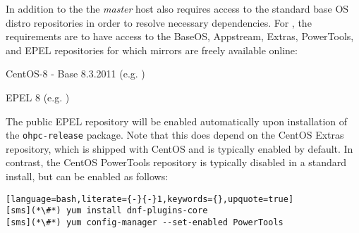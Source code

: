 In addition to the \OHPC{} 
\iftoggle{isxCAT}{and \xCAT{} package repositories,}{package repository,}
the {\em master} host also requires access to the standard base OS distro
repositories in order to resolve necessary dependencies. For \baseOS{}, the
requirements are to have access to the BaseOS, Appstream, Extras, PowerTools,
and EPEL repositories for which mirrors are freely available online:

\begin{itemize*}
\item CentOS-8 - Base 8.3.2011
  (e.g. \href{http://mirror.centos.org/centos-8/8/}
             {\color{blue}{http://mirror.centos.org/centos-8/8/}} )
\item EPEL 8 (e.g. \href{http://download.fedoraproject.org/pub/epel/8/}
                        {\color{blue}{http://download.fedoraproject.org/pub/epel/8/}} )
\end{itemize*}

\noindent The public EPEL repository will be enabled automatically upon
installation of the \texttt{ohpc-release} package. Note that this does depend
on the CentOS Extras repository, which is shipped with CentOS and is typically
enabled by default.  In contrast, the CentOS PowerTools repository is typically
disabled in a standard install, but can be enabled as follows:

\begin{lstlisting}[language=bash,literate={-}{-}1,keywords={},upquote=true]
[sms](*\#*) yum install dnf-plugins-core
[sms](*\#*) yum config-manager --set-enabled PowerTools
\end{lstlisting}
